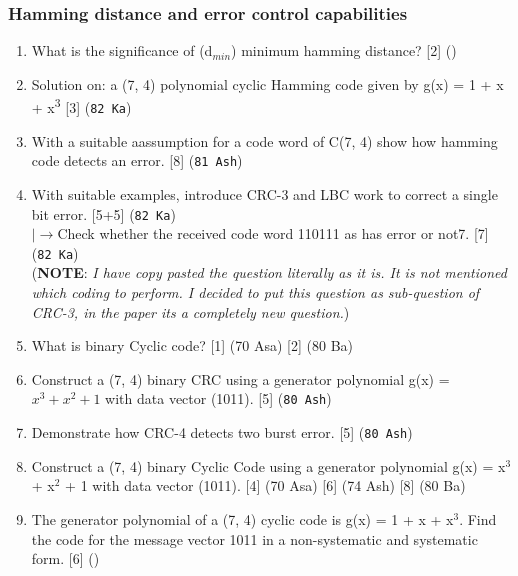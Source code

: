 \documentclass[12pt]{article}
\newcommand{\lb}{\\$\left|\rightarrow\right.$}
\newcommand{\super}[1]{\textsuperscript{#1}}
\begin{document}
    \subsubsection{Hamming distance and error control capabilities}
      \begin{enumerate}
      	\item What is the significance of (d$_{min}$) minimum hamming distance? \hfill [2] ()
      	
        \item Solution on: a (7, 4) polynomial cyclic Hamming code given by g(x) = 1 + x + x\super{3} \hfill [3] (\texttt{82 Ka})

        \item With a suitable aassumption for a code word of C(7, 4) show how hamming code detects an error. \hfill [8] (\texttt{81 Ash})

        \item With suitable examples, introduce CRC-3 and LBC work to correct a single bit error. \hfill [5+5] (\texttt{82 Ka})
          \lb Check whether the received code word 110111 as has error or not7. \hfill [7] (\texttt{82 Ka})\\
          (\textbf{NOTE}: \textit{I have copy pasted the question literally as it is. It is not mentioned which coding to perform. I decided to put this question as sub-question of CRC-3, in the paper its a completely new question.})

      	\item What is binary Cyclic code? \hfill [1] (70 Asa) [2] (80 Ba)
      	
        \item Construct a (7, 4) binary CRC using a generator polynomial g(x) = $x^3 + x^2 + 1$ with data vector (1011). \hfill [5] (\texttt{80 Ash})

        \item Demonstrate how CRC-4 detects two burst error. \hfill [5] (\texttt{80 Ash})

      	\item Construct a (7, 4) binary Cyclic Code using a generator polynomial g(x) = x$^3$ + x$^2$ + 1 with data vector (1011). \hfill [4] (70 Asa) [6] (74 Ash) [8] (80 Ba)
      	
      	\item The generator polynomial of a (7, 4) cyclic code is g(x) = 1 + x + x$^3$. Find the code for the message vector 1011 in a non-systematic and systematic form. \hfill [6] ()
      	

\end{enumerate}
\end{document}
